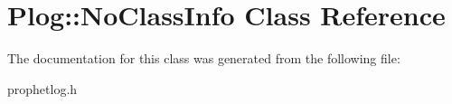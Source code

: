 \hypertarget{classPlog_1_1NoClassInfo}{
\section{Plog::NoClassInfo Class Reference}
\label{classPlog_1_1NoClassInfo}
}


The documentation for this class was generated from the following file:\begin{DoxyCompactItemize}
\item 
prophetlog.h\end{DoxyCompactItemize}
